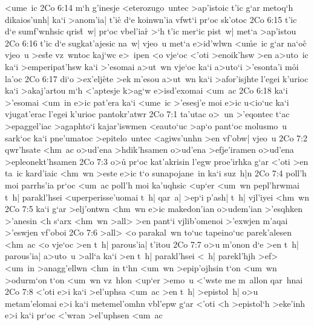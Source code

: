 <ume~ic\bibvsend
\vs 2Co 6:14
m`h
g'inesje
<eterozugo~untec
>ap'istoic
t'ic
g`ar
metoq`h
dikaios'unh|
ka`i
>anom'ia|
t'ic\r{}
d`e
koinwn'ia
vfwt`i
pr`oc
sk'otoc\bibvsend
\vs 2Co 6:15
t'ic
d`e
sumf'wnhsic
qris\r{t}~w|
pr`oc
vbel'ia\r{r}
>`h
t'ic
mer`ic
pist~w|
met`a
>ap'istou\bibvsend
\vs 2Co 6:16
t'ic
d`e
sugkat'ajesic
na~w|
vjeo~u
met`a
e>id'wlwn
<u\r{m}e~ic
g`ar
na`o\r{c}
vjeo~u
>es\r{t}e
vz~wntoc
kaj`wc
e>~ipen
<o
vje`oc
<'oti
>enoik'hsw
>en
a>uto~ic
ka`i
>emperipat'hsw
ka`i
>'esomai
a>ut~wn
vje`oc
ka`i
a>uto`i
>'esonta'i
m\r{o}i
la'oc\bibvsend
\vs 2Co 6:17
di`o
>ex'elj\r{e}te
>ek
m'esou
a>ut~wn
ka`i
>afor'isjhte
l'egei
k'urioc
ka`i
>akaj'artou
m`h
<'aptesje
k>ag`w
e>isd'exomai
<um~ac\bibvsend
\vs 2Co 6:18
ka`i
>'esomai
<um~in
e>ic
pat'era
ka`i
<ume~ic
>'esesj'e
moi
e>ic
u<io`uc
ka`i
vjugat'erac
l'egei
k'urioc
pantokr'atwr\bibvsend
\vs 2Co 7:1
ta'utac
o>~un
>'eqontec
t`ac
>epaggel'iac
>agaphto`i
kajar'iswmen
<eauto`uc
>ap`o
pant`oc
molusmo~u
sark`oc
ka`i
pne'umatoc
>epitelo~untec
<agiws'unhn
>en
vf'obw|
vjeo~u\bibvsend
\vs 2Co 7:2
qwr'hsate
<hm~ac
o>ud'ena
>hdik'hsamen
o>ud'ena
>efje'iramen
o>ud'ena
>epleonekt'hsamen\bibvsend
\vs 2Co 7:3
o>u\r{}
pr`oc
kat'akrisin
l'egw
proe'irhka
g`ar
<'oti
>en
ta~ic
kard'iaic
<hm~wn
>este
e>ic
t`o
sunapojane~in
ka`i
suz~h|n\bibvsend
\vs 2Co 7:4
poll'h
moi
parrhs'ia
pr`oc
<um~ac
poll'h
moi
ka'uqhsic
<up`er
<um~wn
pepl'hrwmai
t~h|
parakl'hsei
<uperperisse'uomai
t~h|
qar~a|
>ep`i
p'ash|
t~h|
vjl'iyei
<hm~wn\bibvsend
\vs 2Co 7:5
ka`i
g`ar
>elj'ontwn
<hm~wn
e>ic
makedon'ian
o>udem'ian
>'esqhken
>'anesin
<h
s`arx
<hm~wn
>all>
>en
pant`i
vjlib'omenoi
>'exwjen
m'aqai
>'eswjen
vf'oboi\bibvsend
\vs 2Co 7:6
>all>
<o
parakal~wn
to`uc
tapeino`uc
parek'alesen
<hm~ac
<o
vje`oc
>en
t~h|
parous'ia|
t'itou\bibvsend
\vs 2Co 7:7
o>u
m'onon
d`e
>en
t~h|
parous'ia|
a>uto~u
>all`a
ka`i
>en
t~h|
parakl'hsei
<~h|
parekl'hjh
>ef>
<um~in
>anagg'ellwn
<hm~in
t`hn
<um~wn
>epip'ojhsin
t`on
<um~wn
>odurm`on
t`on
<um~wn
vz~hlon
<up`er
>emo~u
<'wste
me
m~allon
qar~hnai\bibvsend
\vs 2Co 7:8
<'oti
e>i
ka`i
>el'uphsa
<um~ac
>en
t~h|
>epistol~h|
o>u
metam'elomai
e>i
ka`i
metemel'omhn
vbl'epw
g`ar
<'oti
<h
>epistol`h
>eke'inh
e>i
ka`i
pr`oc
<'wran
>el'uphsen
<um~ac\bibvsend
